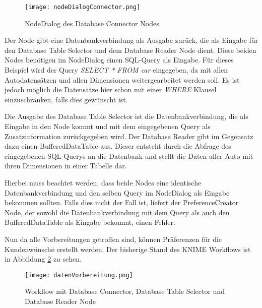 \begin{figure}[H]
	\centering
	\texttt{[image: nodeDialogConnector.png]}
	\caption{NodeDialog des Database Connector Nodes}
	\label{img:nodeDialogConnector}
\end{figure} 

Der Node gibt eine Datenbankverbindung als Ausgabe zurück, die als Eingabe für den Database Table Selector und dem Database Reader Node dient. Diese beiden Nodes benötigen im NodeDialog einen SQL-Query als Eingabe. Für dieses Beispiel wird der Query \textit{SELECT * FROM car} eingegeben, da mit allen Autodatensätzen und allen Dimensionen weitergearbeitet werden soll. Es ist jedoch möglich die Datensätze hier schon mit einer \textit{WHERE} Klausel einzuschränken, falls dies gewünscht ist.

Die Ausgabe des Database Table Selector ist die Datenbankverbindung, die als Eingabe in den Node kommt und mit dem eingegebenen Query als Zusatzinformation zurückgegeben wird. Der Database Reader gibt im Gegensatz dazu einen BufferedDataTable aus. Dieser entsteht durch die Abfrage des eingegebenen SQL-Querys an die Datenbank und stellt die Daten aller Auto mit ihren Dimensionen in einer Tabelle dar. 

Hierbei muss beachtet werden, dass beide Nodes eine identische Datenbankverbindung und den selben Query im NodeDialog als Eingabe bekommen sollten. Falls dies nicht der Fall ist, liefert der PreferenceCreator Node, der sowohl die Datenbankverbindung mit dem Query als auch den BufferedDataTable als Eingabe bekommt, einen Fehler.

Nun da alle Vorbereitungen getroffen sind, können Präferenzen für die Kundenwünsche erstellt werden. Der bisherige Stand des KNIME Workflows ist in Abbildung \ref{img:datenVorbereitung} zu sehen.

\begin{figure}[H]
	\centering
	\texttt{[image: datenVorbereitung.png]}
	\caption{Workflow mit Database Connector, Database Table Selector und Database Reader Node}
	\label{img:datenVorbereitung}
\end{figure} 
